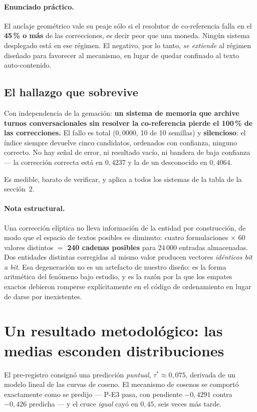 \documentclass[11pt,a4paper]{article}
\begin{document}
\paragraph{Enunciado práctico.} El anclaje geométrico vale su peaje sólo si el resolutor de
co-referencia falla en el \textbf{45\,\% o más} de las correcciones, es decir peor que una moneda.
Ningún sistema desplegado está en ese régimen. El negativo, por lo tanto, \emph{se extiende} al
régimen diseñado para favorecer al mecanismo, en lugar de quedar confinado al texto auto-contenido.

\subsection{El hallazgo que sobrevive}

Con independencia de la gemación: \textbf{un sistema de memoria que archive turnos conversacionales
sin resolver la co-referencia pierde el 100\,\% de las correcciones.} El fallo es total ($0{,}0000$,
10 de 10 semillas) y \textbf{silencioso}: el índice siempre devuelve cinco candidatos, ordenados con
confianza, ninguno correcto. No hay señal de error, ni resultado vacío, ni bandera de baja confianza
--- la corrección correcta está en $0{,}4237$ y la de un desconocido en $0{,}4064$.

Es medible, barato de verificar, y aplica a todos los sistemas de la tabla de la sección~2.

\paragraph{Nota estructural.} Una corrección elíptica no lleva información de la entidad por
construcción, de modo que el espacio de textos posibles es diminuto: cuatro formulaciones $\times$ 60
valores distintos $=$ \textbf{240 cadenas posibles} para 24\,000 entradas almacenadas. Dos entidades
distintas corregidas al mismo valor producen vectores \emph{idénticos bit a bit}. Esa degeneración no
es un artefacto de nuestro diseño: es la forma aritmética del fenómeno bajo estudio, y es la razón por
la que los empates exactos debieron romperse explícitamente en el código de ordenamiento en lugar de
darse por inexistentes.

\section{Un resultado metodológico: las medias esconden distribuciones}

El pre-registro consignó una predicción \emph{puntual}, $\tau^{*} \approx 0{,}075$, derivada de un
modelo lineal de las curvas de coseno. El mecanismo de cosenos se comportó exactamente como se
predijo --- P-E3 pasa, con pendiente $-0{,}4291$ contra $-0{,}426$ predicha --- y el cruce
\emph{igual} cayó en $0{,}45$, seis veces más tarde.
\end{document}
